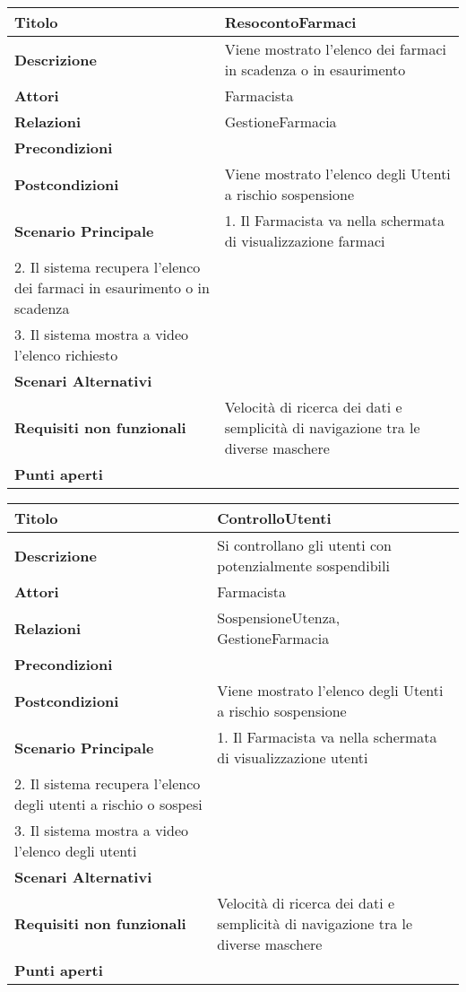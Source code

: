 \begin{tabular} {|P{4.5cm}|P{12.5cm}|}
  \hline
    \textbf{Titolo} & ResocontoFarmaci\\
  \hline
    \textbf{Descrizione} & Viene mostrato l'elenco dei farmaci in scadenza o in esaurimento\\
  \hline
    \textbf{Attori} & Farmacista\\
  \hline
    \textbf{Relazioni} & GestioneFarmacia\\
  \hline
    \textbf{Precondizioni} &\\
  \hline
    \textbf{Postcondizioni} & Viene mostrato l'elenco degli Utenti a rischio sospensione\\
  \hline
    \textbf{Scenario Principale} & 1. Il Farmacista va nella schermata di visualizzazione farmaci \\ 2. Il sistema recupera l'elenco dei farmaci in esaurimento o in scadenza \\ 3. Il sistema mostra a video l'elenco richiesto\\
  \hline
    \textbf{Scenari Alternativi} &\\
  \hline
    \textbf{Requisiti non funzionali} & Velocità di ricerca dei dati e semplicità di navigazione tra le diverse maschere\\
  \hline
    \textbf{Punti aperti} &\\
  \hline
\end{tabular}
\hfill
\break

\begin{tabular} {|P{4.5cm}|P{12.5cm}|}
\hline
  \textbf{Titolo} & ControlloUtenti\\
\hline
  \textbf{Descrizione} & Si controllano gli utenti con potenzialmente sospendibili\\
\hline
  \textbf{Attori} & Farmacista\\
\hline
  \textbf{Relazioni} & SospensioneUtenza, GestioneFarmacia\\
\hline
  \textbf{Precondizioni} &\\
\hline
  \textbf{Postcondizioni} & Viene mostrato l'elenco degli Utenti a rischio sospensione\\
\hline
  \textbf{Scenario Principale} & 1. Il Farmacista va nella schermata di visualizzazione utenti \\ 2. Il sistema recupera l'elenco degli utenti a rischio o sospesi \\ 3. Il sistema mostra a video l'elenco degli utenti\\
\hline
  \textbf{Scenari Alternativi} &\\
\hline
  \textbf{Requisiti non funzionali} & Velocità di ricerca dei dati e semplicità di navigazione tra le diverse maschere\\
\hline
  \textbf{Punti aperti} & \\
\hline
\end{tabular}
\hfill
\break

